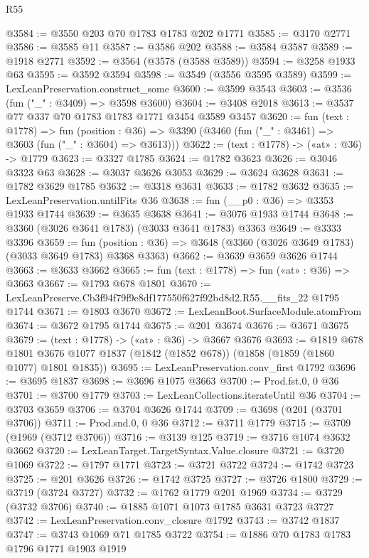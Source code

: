 \begin{lexlean}{R55}
\begin{coremodule}
@3584 := @3550 @203 @70 @1783 @1783 @202 @1771
@3585 := @3170 @2771
@3586 := @3585 @11
@3587 := @3586 @202
@3588 := @3584 @3587
@3589 := @1918 @2771
@3592 := @3564 (@3578 (@3588 @3589))
@3594 := @3258 @1933 @63
@3595 := @3592 @3594
@3598 := @3549 (@3556 @3595 @3589)
@3599 := LexLeanPreservation.construct_some
@3600 := @3599 @3543
@3603 := @3536 (fun ("_" : @3409) => @3598 @3600)
@3604 := @3408 @2018
@3613 := @3537 @77 @337 @70 @1783 @1783 @1771 @3454 @3589 @3457
@3620 := fun (text : @1778) =>
  fun (position : @36) => @3390 (@3460 (fun ("_" : @3461) => @3603 (fun ("_" : @3604) => @3613)))
@3622 := (text : @1778) -> («at» : @36) -> @1779
@3623 := @3327 @1785
@3624 := @1782 @3623
@3626 := @3046 @3323 @63
@3628 := @3037 @3626 @3053
@3629 := @3624 @3628
@3631 := @1782 @3629 @1785
@3632 := @3318 @3631
@3633 := @1782 @3632
@3635 := LexLeanPreservation.untilFits @36
@3638 := fun (__p0 : @36) => @3353 @1933 @1744
@3639 := @3635 @3638
@3641 := @3076 @1933 @1744
@3648 := @3360 (@3026 @3641 @1783) (@3033 @3641 @1783) @3363
@3649 := @3333 @3396
@3659 := fun (position : @36) => @3648 (@3360 (@3026 @3649 @1783) (@3033 @3649 @1783) @3368 @3363)
@3662 := @3639 @3659 @3626 @1744
@3663 := @3633 @3662
@3665 := fun (text : @1778) => fun («at» : @36) => @3663
@3667 := @1793 @678 @1801
@3670 := LexLeanPreserve.Cb3f94f79f9e8df177550f627f92bd8d2.R55.__fits_22 @1795 @1744
@3671 := @1803 @3670
@3672 := LexLeanBoot.SurfaceModule.atomFrom
@3674 := @3672 @1795 @1744
@3675 := @201 @3674
@3676 := @3671 @3675
@3679 := (text : @1778) -> («at» : @36) -> @3667 @3676
@3693 := @1819
    @678
    @1801
    @3676
    @1077
    @1837
    (@1842 (@1852 @678))
    (@1858 (@1859 (@1860 @1077) @1801 @1835))
@3695 := LexLeanPreservation.conv_first @1792
@3696 := @3695 @1837
@3698 := @3696 @1075 @3663
@3700 := Prod.fst.{0, 0} @36
@3701 := @3700 @1779
@3703 := LexLeanCollections.iterateUntil @36
@3704 := @3703 @3659
@3706 := @3704 @3626 @1744
@3709 := @3698 (@201 (@3701 @3706))
@3711 := Prod.snd.{0, 0} @36
@3712 := @3711 @1779
@3715 := @3709 (@1969 (@3712 @3706))
@3716 := @3139 @125
@3719 := @3716 @1074 @3632 @3662
@3720 := LexLeanTarget.TargetSyntax.Value.closure
@3721 := @3720 @1069
@3722 := @1797 @1771
@3723 := @3721 @3722
@3724 := @1742 @3723
@3725 := @201 @3626
@3726 := @1742 @3725
@3727 := @3726 @1800
@3729 := @3719 (@3724 @3727)
@3732 := @1762 @1779 @201 @1969
@3734 := @3729 (@3732 @3706)
@3740 := @1885 @1071 @1073 @1785 @3631 @3723 @3727
@3742 := LexLeanPreservation.conv_closure @1792
@3743 := @3742 @1837
@3747 := @3743 @1069 @71 @1785 @3722
@3754 := @1886 @70 @1783 @1783 @1796 @1771 @1903 @1919

\end{coremodule}
\end{lexlean}
